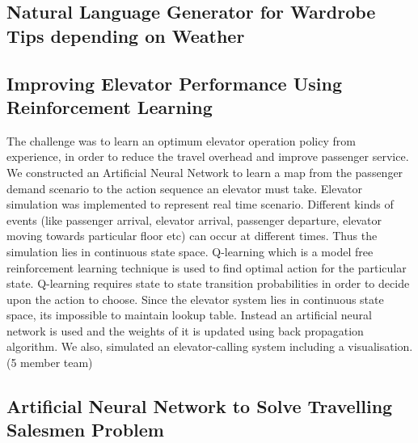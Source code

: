 \documentclass[11pt,a4paper]{moderncv}
\begin{document}
\subsection{Natural Language Generator for Wardrobe Tips depending on Weather}


\subsection{Improving Elevator Performance Using Reinforcement Learning}
 {The challenge was to learn an optimum elevator operation policy from experience, in order to reduce the travel overhead and improve passenger service. We constructed an Artificial Neural Network to learn a map from the passenger demand scenario to the action sequence an elevator must take. 
Elevator simulation was implemented to represent real time scenario. Different kinds of events (like passenger arrival, elevator arrival, passenger departure, elevator moving towards particular floor etc) can occur at different times. Thus the simulation lies in continuous state space. Q-learning which is a model free reinforcement learning technique is used to find optimal action for the particular state. Q-learning requires state to state transition probabilities in order to decide upon the action to choose. Since the elevator system lies in continuous state space, its impossible to maintain lookup table. Instead an artificial neural network is used and the weights of it is updated using back propagation algorithm.
We also, simulated an elevator-calling system including a visualisation. (5 member team)}

\subsection{Artificial Neural Network to Solve Travelling Salesmen Problem}
\end{document}
